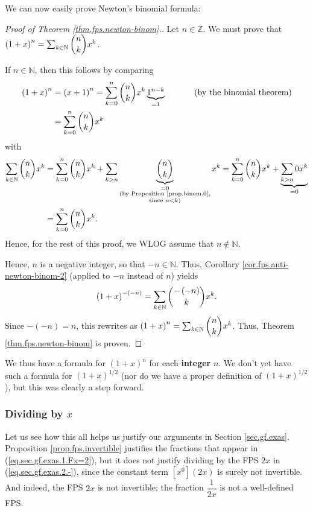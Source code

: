 We can now easily prove Newton's binomial formula:

\begin{proof}
[Proof of Theorem \ref{thm.fps.newton-binom}.]Let $n\in\mathbb{Z}$. We must
prove that $\left(  1+x\right)  ^{n}=\sum_{k\in\mathbb{N}}\dbinom{n}{k}x^{k}$.

If $n\in\mathbb{N}$, then this follows by comparing%
\begin{align*}
\left(  1+x\right)  ^{n}  &  =\left(  x+1\right)  ^{n}=\sum_{k=0}^{n}%
\dbinom{n}{k}x^{k}\underbrace{1^{n-k}}_{=1}\ \ \ \ \ \ \ \ \ \ \left(
\text{by the binomial theorem}\right) \\
&  =\sum_{k=0}^{n}\dbinom{n}{k}x^{k}%
\end{align*}
with%
\begin{align*}
\sum_{k\in\mathbb{N}}\dbinom{n}{k}x^{k}  &  =\sum_{k=0}^{n}\dbinom{n}{k}%
x^{k}+\sum_{k>n}\underbrace{\dbinom{n}{k}}_{\substack{=0\\\text{(by
Proposition \ref{prop.binom.0},}\\\text{since }n<k\text{)}}}x^{k}=\sum
_{k=0}^{n}\dbinom{n}{k}x^{k}+\underbrace{\sum_{k>n}0x^{k}}_{=0}\\
&  =\sum_{k=0}^{n}\dbinom{n}{k}x^{k}.
\end{align*}
Hence, for the rest of this proof, we WLOG assume that $n\notin\mathbb{N}$.

Hence, $n$ is a negative integer, so that $-n\in\mathbb{N}$. Thus, Corollary
\ref{cor.fps.anti-newton-binom-2} (applied to $-n$ instead of $n$) yields%
\[
\left(  1+x\right)  ^{-\left(  -n\right)  }=\sum_{k\in\mathbb{N}}%
\dbinom{-\left(  -n\right)  }{k}x^{k}.
\]
Since $-\left(  -n\right)  =n$, this rewrites as $\left(  1+x\right)
^{n}=\sum_{k\in\mathbb{N}}\dbinom{n}{k}x^{k}$. Thus, Theorem
\ref{thm.fps.newton-binom} is proven.
\end{proof}

We thus have a formula for $\left(  1+x\right)  ^{n}$ for each
\textbf{integer} $n$. We don't yet have such a formula for $\left(
1+x\right)  ^{1/2}$ (nor do we have a proper definition of $\left(
1+x\right)  ^{1/2}$), but this was clearly a step forward.

\subsubsection{Dividing by $x$}

Let us see how this all helps us justify our arguments in Section
\ref{sec.gf.exas}. Proposition \ref{prop.fps.invertible} justifies the
fractions that appear in (\ref{eq.sec.gf.exas.1.Fx=2}), but it does not
justify dividing by the FPS $2x$ in (\ref{eq.sec.gf.exas.2.-}), since the
constant term $\left[  x^{0}\right]  \left(  2x\right)  $ is surely not
invertible. And indeed, the FPS $2x$ is not invertible; the fraction
$\dfrac{1}{2x}$ is not a well-defined FPS.

